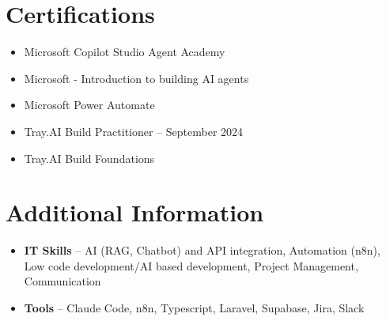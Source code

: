 \documentclass[a4paper,10pt]{article}
\begin{document}
\section{Certifications}
\begin{itemize}
\item Microsoft Copilot Studio Agent Academy
\item Microsoft - Introduction to building AI agents
\item Microsoft Power Automate
\item Tray.AI Build Practitioner -- September 2024
\item Tray.AI Build Foundations
\end{itemize}

\section{Additional Information}
\begin{itemize}
\item \textbf{IT Skills} -- AI (RAG, Chatbot) and API integration, Automation (n8n), Low code development/AI based development, Project Management, Communication
\item \textbf{Tools} -- Claude Code, n8n, Typescript, Laravel, Supabase, Jira, Slack
\end{itemize}
\end{document}
